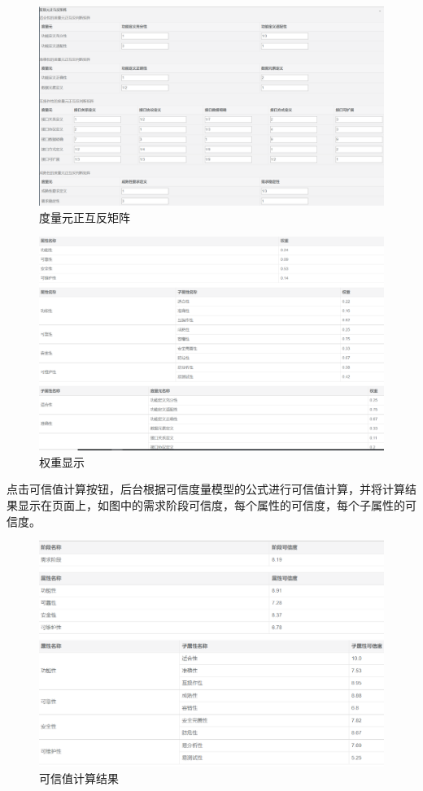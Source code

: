 \begin{figure}[htb]
	\centering
	\includegraphics[width=13cm]{fig/sy5_19.png}
	\caption{度量元正互反矩阵}
	\label{fig:5_17}
\end{figure}

\begin{figure}[htb]
	\centering
	\includegraphics[width=13cm]{fig/sy5_19_1.png}
	\caption{权重显示}
	\label{fig:5_18}
\end{figure}

点击可信值计算按钮，后台根据可信度量模型的公式进行可信值计算，并将计算结果显示在页面上，如图中的需求阶段可信度，每个属性的可信度，每个子属性的可信度。
\begin{figure}[htb]
	\centering
	\includegraphics[width=13cm]{fig/sy5_19_2.png}
	\caption{可信值计算结果}
	\label{fig:5_19}
\end{figure}

